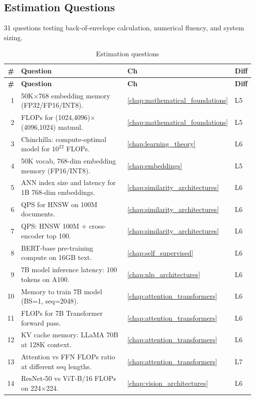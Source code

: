 \subsection{Estimation Questions}

31 questions testing back-of-envelope calculation, numerical fluency, and system sizing.

\begin{longtable}{rp{8.5cm}ll}
\caption{Estimation questions} \\
\toprule
\textbf{\#} & \textbf{Question} & \textbf{Ch} & \textbf{Diff} \\
\midrule
\endfirsthead
\toprule
\textbf{\#} & \textbf{Question} & \textbf{Ch} & \textbf{Diff} \\
\midrule
\endhead
\bottomrule
\endlastfoot

1 & 50K$\times$768 embedding memory (FP32/FP16/INT8). & \ref{chap:mathematical_foundations} & L5 \\
2 & FLOPs for (1024,4096)$\times$(4096,1024) matmul. & \ref{chap:mathematical_foundations} & L5 \\
3 & Chinchilla: compute-optimal model for $10^{22}$ FLOPs. & \ref{chap:learning_theory} & L6 \\
4 & 50K vocab, 768-dim embedding memory (FP16/INT8). & \ref{chap:embeddings} & L5 \\
5 & ANN index size and latency for 1B 768-dim embeddings. & \ref{chap:similarity_architectures} & L6 \\
6 & QPS for HNSW on 100M documents. & \ref{chap:similarity_architectures} & L6 \\
7 & QPS: HNSW 100M + cross-encoder top 100. & \ref{chap:similarity_architectures} & L6 \\
8 & BERT-base pre-training compute on 16GB text. & \ref{chap:self_supervised} & L6 \\
9 & 7B model inference latency: 100 tokens on A100. & \ref{chap:nlp_architectures} & L6 \\
10 & Memory to train 7B model (BS=1, seq=2048). & \ref{chap:attention_transformers} & L6 \\
11 & FLOPs for 7B Transformer forward pass. & \ref{chap:attention_transformers} & L6 \\
12 & KV cache memory: LLaMA 70B at 128K context. & \ref{chap:attention_transformers} & L6 \\
13 & Attention vs FFN FLOPs ratio at different seq lengths. & \ref{chap:attention_transformers} & L7 \\
14 & ResNet-50 vs ViT-B/16 FLOPs on 224$\times$224. & \ref{chap:vision_architectures} & L6 \\

\end{longtable}
